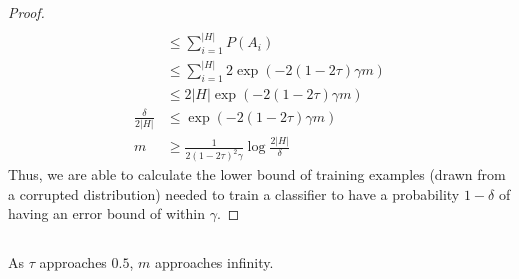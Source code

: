 \documentclass[11pt,a4paper,titlepage]{article}
\begin{document}
{{\begin{proof}
\begin{align*}
    \\ &\leq \sum_{i=1}^{|H|} P(A_i)
    \\ &\leq \sum_{i=1}^{|H|} 2\exp(-2 (1-2\tau) \gamma m)
    \\ &\leq 2|H| \exp(-2 (1-2\tau) \gamma m)
    \\ \frac{\delta}{2|H|} &\leq \exp(-2 (1-2\tau) \gamma m)
    \\ m &\geq \frac{1}{2 (1-2\tau)^2 \gamma}\log\frac{2|H|}{\delta}
\end{align*}
Thus, we are able to calculate the lower bound of training examples (drawn from a corrupted distribution) needed to train a classifier to have a probability $1-\delta$ of having an error bound of within $\gamma$.
\end{proof}
}\label{prob:5b}
\subsection{}{
\quad As $\tau$ approaches $0.5$, $m$ approaches infinity.
}\label{prob:5c}
}\label{problem 5}
\end{document}
